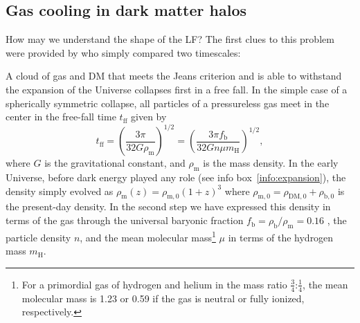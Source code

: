 \documentclass[useAMS,usenatbib,bibyear]{aa}
\begin{document}
\subsection{Gas cooling in dark matter halos}
\label{sec:cooling}

How may we understand the shape of the LF? The first clues to this problem were provided by \citet{Rees1977} who simply compared two timescales: 

A cloud of gas and DM that meets the Jeans criterion and is able to withstand the expansion of the Universe collapses first in a free fall.
In the simple case of a spherically symmetric collapse, all particles of a pressureless gas meet in the center in the free-fall time $t_\mathrm{ff}$ given by
\begin{equation}
    \label{eq:tff}
    t_\mathrm{ff} = \left( \frac{3\pi}{32 G \rho_\mathrm{m}} \right)^{1/2}
                  = \left( \frac{3\pi f_\mathrm{b}}{32 G n \mu m_\mathrm{H}} \right)^{1/2},
\end{equation}
where $G$ is the gravitational constant, and $\rho_\mathrm{m}$ is the mass density. In the early Universe, before dark energy played any role (see info box~\ref{info:expansion}), the density simply evolved as $\rho_\mathrm{m}(z) = \rho_\mathrm{m,0} (1+z)^3$ where $\rho_\mathrm{m,0} = \rho_\mathrm{DM,0} + \rho_\mathrm{b,0}$ is the present-day density.
In the second step we have expressed this density in terms of the gas through the universal baryonic fraction $f_\mathrm{b} = \rho_\mathrm{b}/\rho_\mathrm{m} = 0.16$ \citep{PlanckCollaboration2018a}, the particle density $n$, and the mean molecular mass\footnote{For a primordial gas of hydrogen and helium in the mass ratio $\frac{3}{4}$:$\frac{1}{4}$, the mean molecular mass is 1.23 or 0.59 if the gas is neutral or fully ionized, respectively.} $\mu$ in terms of the hydrogen mass $m_\mathrm{H}$.
\end{document}
